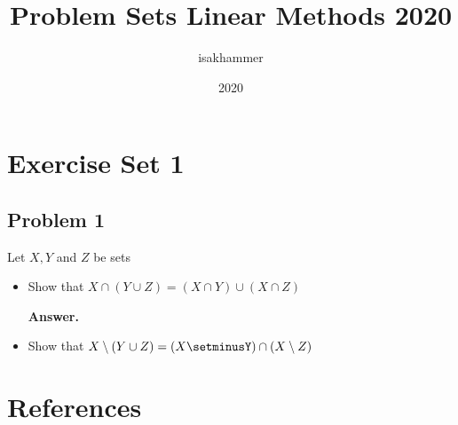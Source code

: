 \documentclass{article}
\title{Problem Sets Linear Methods 2020}
\author{isakhammer }
\date{2020}
\theoremstyle{remark}
\begin{document}
\maketitle
\tableofcontents
\newpage

\newpage
\section{Exercise Set 1}%
\label{sec:exercise_set_1}

\subsection{Problem 1}%
\label{sub:problem_1}

Let $X,Y$ and $Z$ be sets
\begin{itemize}
  \item Show that $X\cap \left( Y\cup Z \right) = \left( X\cap Y \right) \cup  \left( X\cap Z \right)$ 
    \begin{tcolorbox}
      \textbf{Answer.}  
      \[
      
      \] 
    \end{tcolorbox}

  \item Show that $X\setminus \left( Y\cup Z \right) = \left( X \setminusY \right) \cap  \left( X \setminus Z \right)$
\end{itemize}




\newpage
\section{References}%
\label{sec:references}



\end{document}
